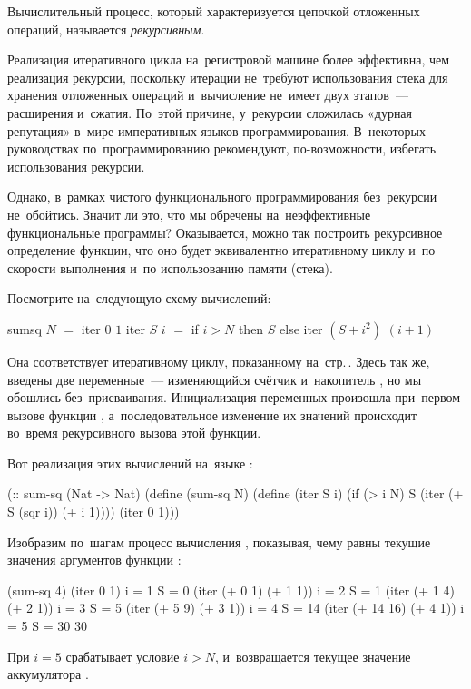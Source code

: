 Вычислительный процесс, который характеризуется цепочкой отложенных операций, называется \emph{рекурсивным}.

Реализация итеративного цикла на~регистровой машине более эффективна, чем реализация рекурсии, поскольку итерации не~требуют использования стека для хранения отложенных операций и~вычисление не~имеет двух этапов~--- расширения и~сжатия. По~этой причине, у~рекурсии сложилась «дурная репутация» в~мире императивных языков программирования. В~некоторых руководствах по~программированию рекомендуют, по-возможности, избегать использования рекурсии.

Однако, в~рамках чистого функционального программирования без~рекурсии не~обойтись. Значит ли это, что мы обречены на~неэффективные функциональные программы? Оказывается, можно так построить рекурсивное определение функции, что оно будет эквивалентно итеративному циклу и~по скорости выполнения и~по использованию памяти (стека).

\newpage
Посмотрите на~следующую схему вычислений:
\begin{SchemeCode}
  sumsq $N$ $=$ iter $0$ $1$ 
  iter $S$ $i$ $=$ if $i > N$
             then $S$
             else iter $(S + i^2)$ $(i + 1)$
\end{SchemeCode}
Она соответствует итеративному циклу, показанному на~стр.\,\pageref{while}. Здесь так же, введены две переменные~--- изменяющийся счётчик  и~накопитель , но мы обошлись без~присваивания. Инициализация переменных произошла при~первом вызове функции , а~последовательное изменение их значений происходит во~время рекурсивного вызова этой функции.

Вот реализация этих вычислений на~языке \Scheme:

\begin{Definition}[emph={N,S,i}]
(:: sum-sq (Nat -> Nat)
  (define (sum-sq N)
    (define (iter S i)
      (if (> i N)
          S
          (iter (+ S (sqr i)) (+ i 1))))
  (iter 0 1)))
\end{Definition}

Изобразим по~шагам процесс вычисления , показывая, чему равны текущие значения аргументов функции :

\begin{SchemeCode}[emph={i,S}]
  (sum-sq 4)
  (iter 0 1)               i = 1  S = 0
  (iter (+ 0 1) (+ 1 1))   i = 2  S = 1
  (iter (+ 1 4) (+ 2 1))   i = 3  S = 5
  (iter (+ 5 9) (+ 3 1))   i = 4  S = 14
  (iter (+ 14 16) (+ 4 1)) i = 5  S = 30
  30
\end{SchemeCode}
При $i = 5$ срабатывает условие $i > N$, и~возвращается текущее значение аккумулятора .

